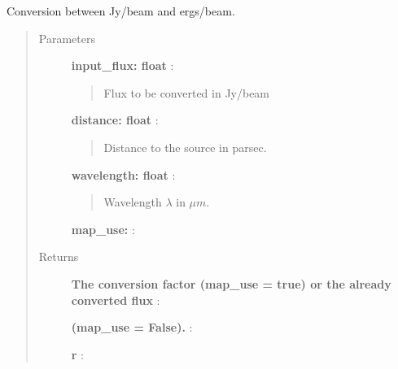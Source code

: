 \documentclass[a4paper,10pt,english]{sphinxmanual}
\begin{document}
\begin{fulllineitems}
\label{functions:astrolyze.functions.units.JyBToErgsB}
Conversion between Jy/beam and ergs/beam.
\begin{quote}\begin{description}
\item[{Parameters }] \leavevmode
\textbf{input\_flux: float} :
\begin{quote}

Flux to be converted in Jy/beam
\end{quote}

\textbf{distance: float} :
\begin{quote}

Distance to the source in parsec.
\end{quote}

\textbf{wavelength: float} :
\begin{quote}

Wavelength $\lambda$ in $\mu m$.
\end{quote}

\textbf{map\_use:} :

\item[{Returns }] \leavevmode
\textbf{The conversion factor (map\_use = true) or the already converted flux} :

\textbf{(map\_use = False).} :

\textbf{r} :

\end{description}\end{quote}

\end{fulllineitems}

\end{document}
